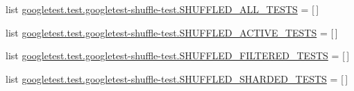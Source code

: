 \begin{DoxyCompactItemize}
\item 
list \mbox{\hyperlink{namespacegoogletest_1_1test_1_1googletest-shuffle-test_ab9eda0e756f057b5bd784cd35abe9a11}{googletest.\+test.\+googletest-\/shuffle-\/test.\+S\+H\+U\+F\+F\+L\+E\+D\+\_\+\+A\+L\+L\+\_\+\+T\+E\+S\+TS}} = \mbox{[}$\,$\mbox{]}
\item 
list \mbox{\hyperlink{namespacegoogletest_1_1test_1_1googletest-shuffle-test_ac78bd9a121af7f78d8e22be1a57e6002}{googletest.\+test.\+googletest-\/shuffle-\/test.\+S\+H\+U\+F\+F\+L\+E\+D\+\_\+\+A\+C\+T\+I\+V\+E\+\_\+\+T\+E\+S\+TS}} = \mbox{[}$\,$\mbox{]}
\item 
list \mbox{\hyperlink{namespacegoogletest_1_1test_1_1googletest-shuffle-test_a98136657778035b6fb7087746cdc602a}{googletest.\+test.\+googletest-\/shuffle-\/test.\+S\+H\+U\+F\+F\+L\+E\+D\+\_\+\+F\+I\+L\+T\+E\+R\+E\+D\+\_\+\+T\+E\+S\+TS}} = \mbox{[}$\,$\mbox{]}
\item 
list \mbox{\hyperlink{namespacegoogletest_1_1test_1_1googletest-shuffle-test_a85901517bb840ae8e27a50d878232ccd}{googletest.\+test.\+googletest-\/shuffle-\/test.\+S\+H\+U\+F\+F\+L\+E\+D\+\_\+\+S\+H\+A\+R\+D\+E\+D\+\_\+\+T\+E\+S\+TS}} = \mbox{[}$\,$\mbox{]}
\end{DoxyCompactItemize}
